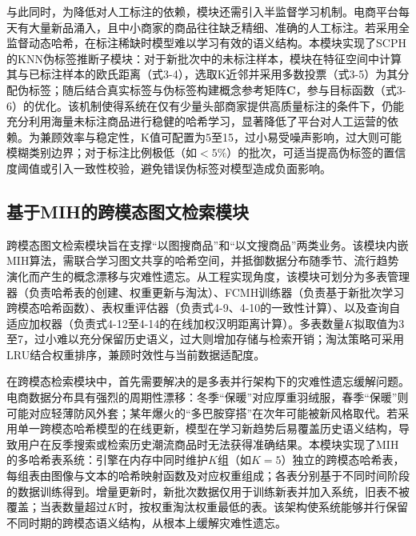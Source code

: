 与此同时，为降低对人工标注的依赖，模块还需引入半监督学习机制。电商平台每天有大量新品涌入，且中小商家的商品往往缺乏精细、准确的人工标注。若采用全监督动态哈希，在标注稀缺时模型难以学习有效的语义结构。本模块实现了SCPH的KNN伪标签推断子模块：对于新批次中的未标注样本，模块在特征空间中计算其与已标注样本的欧氏距离（式3-4），选取K近邻并采用多数投票（式3-5）为其分配伪标签；随后结合真实标签与伪标签构建概念参考矩阵$\mathbf{C}$，参与目标函数（式3-6）的优化。该机制使得系统在仅有少量头部商家提供高质量标注的条件下，仍能充分利用海量未标注商品进行稳健的哈希学习，显著降低了平台对人工运营的依赖。为兼顾效率与稳定性，K值可配置为5至15，过小易受噪声影响，过大则可能模糊类别边界；对于标注比例极低（如$<5\%$）的批次，可适当提高伪标签的置信度阈值或引入一致性校验，避免错误伪标签对模型造成负面影响。

\subsection{基于MIH的跨模态图文检索模块}

跨模态图文检索模块旨在支撑“以图搜商品”和“以文搜商品”两类业务。该模块内嵌MIH算法，需联合学习图文共享的哈希空间，并抵御数据分布随季节、流行趋势演化而产生的概念漂移与灾难性遗忘。从工程实现角度，该模块可划分为多表管理器（负责哈希表的创建、权重更新与淘汰）、FCMH训练器（负责基于新批次学习跨模态哈希函数）、表权重评估器（负责式4-9、4-10的一致性计算）、以及查询自适应加权器（负责式4-12至4-14的在线加权汉明距离计算）。多表数量$K$拟取值为3至7，过小难以充分保留历史语义，过大则增加存储与检索开销；淘汰策略可采用LRU结合权重排序，兼顾时效性与当前数据适配度。

在跨模态检索模块中，首先需要解决的是多表并行架构下的灾难性遗忘缓解问题。电商数据分布具有强烈的周期性漂移：冬季“保暖”对应厚重羽绒服，春季“保暖”则可能对应轻薄防风外套；某年爆火的“多巴胺穿搭”在次年可能被新风格取代。若采用单一跨模态哈希模型的在线更新，模型在学习新趋势后易覆盖历史语义结构，导致用户在反季搜索或检索历史潮流商品时无法获得准确结果。本模块实现了MIH的多哈希表系统：引擎在内存中同时维护$K$组（如$K=5$）独立的跨模态哈希表，每组表由图像与文本的哈希映射函数及对应权重组成；各表分别基于不同时间阶段的数据训练得到。增量更新时，新批次数据仅用于训练新表并加入系统，旧表不被覆盖；当表数量超过$K$时，按权重淘汰权重最低的表。该架构使系统能够并行保留不同时期的跨模态语义结构，从根本上缓解灾难性遗忘。

